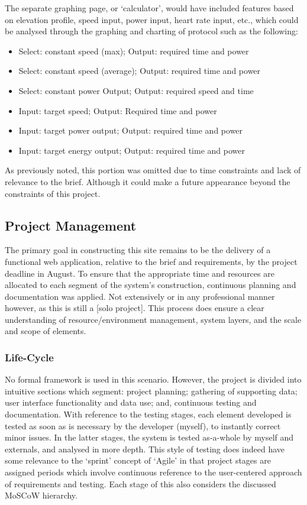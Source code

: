 \documentclass[11pt, english]{article}
\begin{document}
		The separate graphing page, or `calculator', would have included features based on elevation profile, speed input, power input, heart rate input, etc., which could be analysed through the graphing and charting of protocol such as the following:

		\begin{itemize}
		\setlength\itemsep{0cm}
			\item Select: constant speed (max); Output: required time and power
			\item Select: constant speed (average); Output: required time and power
			\item Select: constant power Output; Output: required speed and time
			\item Input: target speed; Output: Required time and power
			\item Input: target power output; Output: required time and power
			\item Input: target energy output; Output: required time and power
		\end{itemize}

		As previously noted, this portion was omitted due to time constraints and lack of relevance to the brief. Although it could make a future appearance beyond the constraints of this project.

\newpage

	\subsection{Project Management}

	The primary goal in constructing this site remains to be the delivery of a functional web application, relative to the brief and requirements, by the project deadline in August. To ensure that the appropriate time and resources are allocated to each segment of the system's construction, continuous planning and documentation was applied. Not extensively or in any professional manner however, as this is still a [solo project]. This process does ensure a clear understanding of resource/environment management, system layers, and the scale and scope of elements.

		\subsubsection{Life-Cycle}

	No formal framework is used in this scenario. However, the project is divided into intuitive sections which segment: project planning; gathering of supporting data; user interface functionality and data use; and, continuous testing and documentation. With reference to the testing stages, each element developed is tested as soon as is necessary by the developer (myself), to instantly correct minor issues. In the latter stages, the system is tested as-a-whole by myself and externals, and analysed in more depth. This style of testing does indeed have some relevance to the `sprint' concept of `Agile' in that project stages are assigned periods which involve continuous reference to the user-centered approach of requirements and testing. Each stage of this also considers the discussed MoSCoW hierarchy.\\
\end{document}
